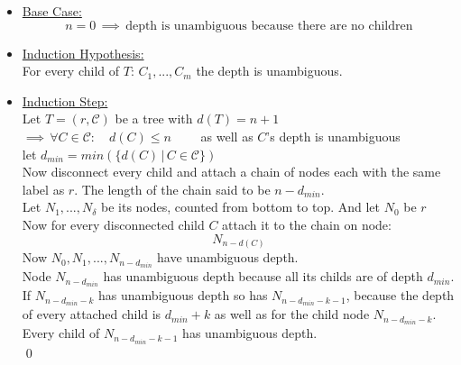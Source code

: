 \documentclass[a4paper,12pt]{article}
\theoremstyle{definition}
\begin{document}
	\begin{itemize}
		\item \underline{Base Case:}
			\[n=0 \,\implies \, \text{depth is unambiguous because there are no children}\]
		\item \underline{Induction Hypothesis:}\\
			For every child of $T$: $C_1,...,C_m$ the depth is unambiguous.
		\item \underline{Induction Step:}\\
		Let $T=(r,\mathcal{C})$ be a tree with $d(T) = n + 1$\\
		$\implies \,\forall C \in \mathcal{C}:\quad d(C)\leq n\qquad $ as well as $C$'s depth is unambiguous\\
		let $d_{min} = min\left(\{d(C)\, \vert \, C\in\mathcal{C}\}\right)$\\
		Now disconnect every child and attach a chain of nodes each with the same label as $r$. The length of the chain said to be $n - d_{min}$.\\
		Let $N_1,...,N_\delta$ be its nodes, counted from bottom to top. And let $N_0$ be $r$\\
		Now for every disconnected child $C$ attach it to the chain on node:
		\[N_{n - d(C)}\]
		Now $N_0,N_1,...,N_{n-d_{min}}$ have unambiguous depth.\\
		Node $N_{n-d_{min}}$ has unambiguous depth because all its childs are of depth $d_{min}$.\\
		If $N_{n-d_{min} - k }$ has unambiguous depth so has $N_{n- d_{min} - k - 1}$, because the depth of every attached child is $d_{min} + k$ as well as for the child node $N_{n-d_{min} - k}$. Every child of $N_{n- d_{min} - k - 1}$ has unambiguous depth. \\\qed
	\end{itemize}
\end{document}
